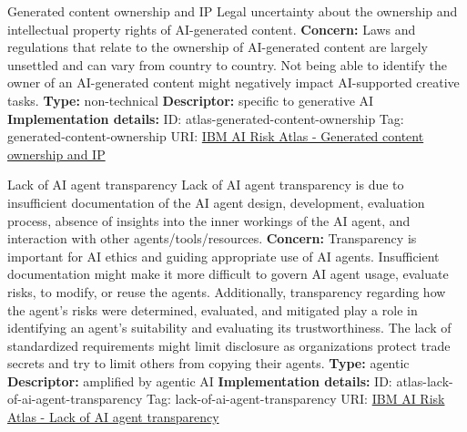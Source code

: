 \begin{definitionbox}{Generated content ownership and IP}
Legal uncertainty about the ownership and intellectual property rights of AI-generated content.\newline\newline
\textbf{Concern: }Laws and regulations that relate to the ownership of AI-generated content are largely unsettled and can vary from country to country. Not being able to identify the owner of an AI-generated content might negatively impact AI-supported creative tasks.\newline\newline
\textbf{Type: }non-technical\newline
\textbf{Descriptor: }specific to generative AI \newline\newline
\textbf{Implementation details: } \newline
ID: atlas-generated-content-ownership \newline
Tag: generated-content-ownership \newline
URI:  \href{https://www.ibm.com/docs/en/watsonx/saas?topic=SSYOK8/wsj/ai-risk-atlas/generated-content-ownership.html}{IBM AI Risk Atlas - Generated content ownership and IP}\newline
\end{definitionbox}
\begin{definitionbox}{Lack of AI agent transparency}
Lack of AI agent transparency is due to insufficient documentation of the AI agent design, development, evaluation process, absence of insights into the inner workings of the AI agent, and interaction with other agents/tools/resources.\newline\newline
\textbf{Concern: }Transparency is important for AI ethics and guiding appropriate use of AI agents. Insufficient documentation might make it more difficult to govern AI agent usage, evaluate risks, to modify, or reuse the agents.  Additionally, transparency regarding how the agent's risks were determined, evaluated, and mitigated play a role in identifying an agent's suitability and evaluating its trustworthiness. The lack of standardized requirements might limit disclosure as organizations protect trade secrets and try to limit others from copying their agents.\newline\newline
\textbf{Type: }agentic\newline
\textbf{Descriptor: }amplified by agentic AI \newline\newline
\textbf{Implementation details: } \newline
ID: atlas-lack-of-ai-agent-transparency \newline
Tag: lack-of-ai-agent-transparency \newline
URI:  \href{https://www.ibm.com/docs/en/watsonx/saas?topic=SSYOK8/wsj/ai-risk-atlas/lack-of-ai-agent-transparency.html}{IBM AI Risk Atlas - Lack of AI agent transparency}\newline
\end{definitionbox}
